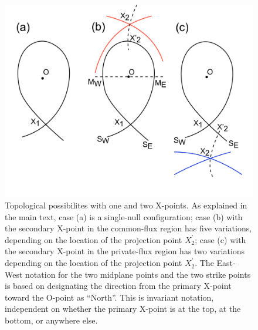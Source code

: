 \newpage

\begin{figure}[H]
    \centering
    \includegraphics[width=\linewidth]{figures/all_conf.pdf}

    \caption{Topological possibilites with one and two X-points. As
    explained in the main text, case (a) is a single-null
    configuration; case (b) with the secondary X-point in the
    common-flux region has five variations, depending on the location
    of the projection point $X_2^{\prime}$; case (c) with the
    secondary X-point in the private-flux region has two variations
    depending on the location of the projection point $X_2^{\prime}$.
    The East-West notation for the two midplane points and the two
    strike points is based on designating the direction from the
    primary X-point toward the O-point as ``North''. This is invariant
    notation, independent on whether the primary X-point is at the
    top, at the bottom, or anywhere else.}

    \label{fig:all_conf}
\end{figure}



